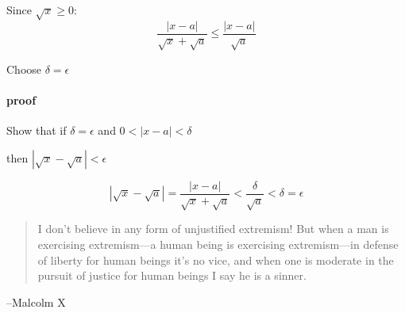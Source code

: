 \documentclass[letterpaper, landscape]{exam}
\begin{document}
\begin{description}
        Since $\sqrt{x} \geq 0$:
        \[
          \frac{|x - a|}{\sqrt{x} + \sqrt{a}} \leq \frac{|x - a|}{\sqrt{a}}
        \]

        Choose $\delta = \epsilon$

        \paragraph{proof}
        Show that if $\delta = \epsilon$ and $0 < |x - a| < \delta$ 
        
        then $\left| \sqrt{x} - \sqrt{a} \right| < \epsilon$

        \[
          \left| \sqrt{x} - \sqrt{a} \right| = \frac{|x - a|}{\sqrt{x} + \sqrt{a}} < \frac{\delta}{\sqrt{a}} < \delta = \epsilon
        \]

    \end{description}

  \else
    \vspace{10 cm}
    \begin{quote}
      \begin{em}
        I don't believe in any form of unjustified extremism! But when a man is
        exercising extremism---a human being is exercising extremism---in
        defense of liberty for human beings it's no vice, and when one is
        moderate in the pursuit of justice for human beings I say he is a
        sinner. 
      \end{em}
    \end{quote}
    \hspace{1 cm} --Malcolm X
  \fi
\end{document}
